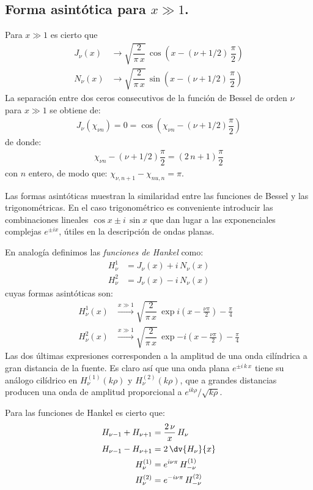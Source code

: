 \subsection{Forma asintótica para $x \gg 1$.}
Para $x \gg 1$ es cierto que
\begin{align*}
J_{\nu} (x) &\to \sqrt{\dfrac{2}{\pi \, x}} \, \cos \left( x - (\nu + 1/2) \, \dfrac{\pi}{2} \right) \\
N_{\nu} (x) &\to \sqrt{\dfrac{2}{\pi \, x}} \, \sin \left( x - (\nu + 1/2) \, \dfrac{\pi}{2} \right)
\end{align*}
La separación entre dos ceros consecutivos de la función de Bessel de orden $\nu$ para $x \gg 1$ se obtiene de:
\begin{align*}
J_{\nu}(\chi_{\nu n}) = 0 = \cos (\chi_{\nu n} - (\nu + 1/2) \dfrac{\pi}{2})
\end{align*}
de donde:
\begin{align*}
\chi_{\nu n} - (\nu +  1/2) \dfrac{\pi}{2} = (2 \, n + 1) \dfrac{\pi}{2}
\end{align*}
con $n$ entero, de modo que: $\chi_{\nu, n+1} - \chi_{nu,n} = \pi$.
\par
Las formas asintóticas muestran la similaridad entre las funciones de Bessel y las trigonométricas. En el caso trigonométrico es conveniente introducir las combinaciones lineales $\cos x \pm i \, \sin x$ que dan lugar a las exponenciales complejas $e^{\pm i x}$, útiles en la descripción de ondas planas. 
\par
En analogía  definimos las \emph{funciones de Hankel} como:
\begin{align*}
H_{\nu}^{1} &= J_{\nu} (x) + i \, N_{\nu} (x) \\
H_{\nu}^{2} &= J_{\nu} (x) - i \, N_{\nu} (x)  
\end{align*}
cuyas formas asintóticas son:
\begin{align*}
H_{\nu}^{1}(x) & \xrightarrow{\text{$x \gg 1$}} \sqrt{\dfrac{2}{\pi \, x}} \, \exp{i (x - \frac{\nu \pi}{2}) - \frac{\pi}{4}} \\
H_{\nu}^{2}(x) & \xrightarrow{\text{$x \gg 1$}} \sqrt{\dfrac{2}{\pi \, x}} \, \exp{-i (x - \frac{\nu \pi}{2}) - \frac{\pi}{4}} 
\end{align*}
Las dos últimas expresiones corresponden a la amplitud de una onda cilíndrica a gran distancia de la fuente. Es claro así que una onda plana $e^{\pm i \, k \, x}$ tiene su análogo cilídrico en $H_{\nu}^{(1)} (k \rho)$ y $H_{\nu}^{(2)} (k \rho)$, que a grandes distancias producen una onda de amplitud proporcional a $e^{i k \rho} / \sqrt{k \rho}$.
\par
Para las funciones de Hankel es cierto que:
\begin{align*}
H_{\nu-1} + H_{\nu+1} &= \dfrac{2 \, \nu}{x} \, H_{\nu} \\
H_{\nu-1} - H_{\nu+1} &= 2 \, \dv{H_{\nu}}{x} \\
H_{\nu}^{(1)} &= e^{i \nu \pi} \, H_{-\nu}^{(1)} \\
H_{\nu}^{(2)} &= e^{-i \nu \pi} \, H_{-\nu}^{(2)} 
\end{align*}
